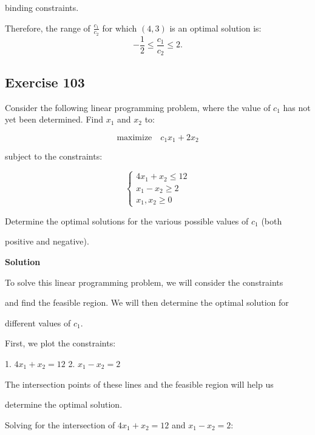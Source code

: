 \documentclass{article}
\begin{document}
binding constraints.

\vspace{\baselineskip}

Therefore, the range of \( \frac{c_1}{c_2} \) for which \( (4, 3) \) is an optimal solution is:
\[
-\frac{1}{2} \leq \frac{c_1}{c_2} \leq 2.
\]

\subsection*{Exercise 103}

Consider the following linear programming problem, where the value of \( c_1 \) has not yet been determined. Find \( x_1 \) and \( x_2 \) to:

\[
\text{maximize} \quad c_1 x_1 + 2 x_2
\]

subject to the constraints:

\[
\begin{cases}
4x_1 + x_2 \leq 12 \\
x_1 - x_2 \geq 2 \\
x_1, x_2 \geq 0
\end{cases}
\]

Determine the optimal solutions for the various possible values of \( c_1 \) (both 

positive and negative).

\vspace{\baselineskip}

\textbf{Solution}

To solve this linear programming problem, we will consider the constraints 

and find the feasible region. We will then determine the optimal solution for 

different values of \( c_1 \).

\vspace{\baselineskip}

First, we plot the constraints:

\vspace{\baselineskip}

1. \( 4x_1 + x_2 = 12 \)
2. \( x_1 - x_2 = 2 \)

The intersection points of these lines and the feasible region will help us 

determine the optimal solution.

\vspace{\baselineskip}

Solving for the intersection of \( 4x_1 + x_2 = 12 \) and \( x_1 - x_2 = 2 \):
\end{document}
